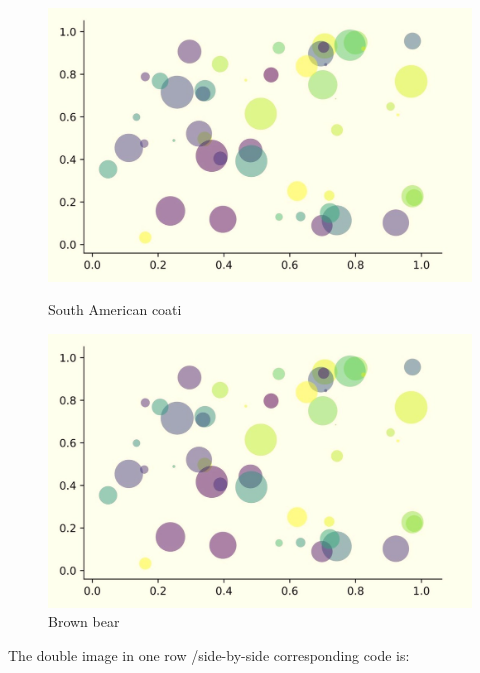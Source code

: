 \documentclass[11pt]{elegantbook}
\begin{document}
\begin{figure}[ht]
	\begin{minipage}[b]{0.45\linewidth}
		\centering
		\includegraphics[width=\textwidth]{figure/scatter.jpg}
		\caption{South American coati}
		\label{fig:nasua}
	\end{minipage}
	\hspace{0.5cm}
	\begin{minipage}[b]{0.45\linewidth}
		\centering
		\includegraphics[width=\textwidth]{figure/scatter.jpg}
		\caption{Brown bear}
		\label{fig:Ursus-arctos}
	\end{minipage}
\end{figure}
The double image in one row /side-by-side corresponding code is: 
\end{document}
